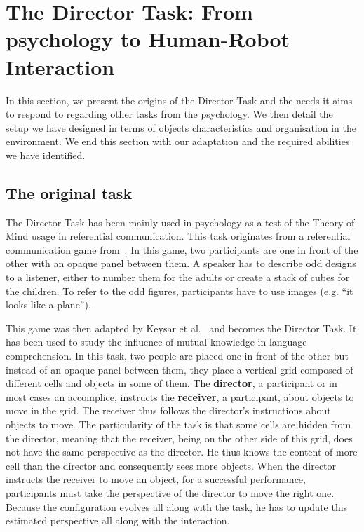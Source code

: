 \section[From psychology to Human-Robot Interaction]{The Director Task: From psychology to Human-Robot Interaction}

In this section, we present the origins of the Director Task and the needs it aims to respond to regarding other tasks from the psychology. We then detail the setup we have designed in terms of objects characteristics and organisation in the environment. We end this section with our adaptation and the required abilities we have identified.

\subsection{The original task}

The Director Task has been mainly used in psychology as a test of the Theory-of-Mind usage in referential communication. This task originates from a referential communication game from~\cite{krauss_1977_social}. In this game, two participants are one in front of the other with an opaque panel between them. A speaker has to describe odd designs to a listener, either to number them for the adults or create a stack of cubes for the children. To refer to the odd figures, participants have to use images (e.g. ``it looks like a plane'').

This game was then adapted by Keysar et al.~\cite{keysar_2000_taking} and becomes the Director Task. It has been used to study the influence of mutual knowledge in language comprehension. In this task, two people are placed one in front of the other but instead of an opaque panel between them, they place a vertical grid composed of different cells and objects in some of them. The \textbf{director}, a participant or in most cases an accomplice, instructs the \textbf{receiver}, a participant, about objects to move in the grid. The receiver thus follows the director's instructions about objects to move. The particularity of the task is that some cells are hidden from the director, meaning that the receiver, being on the other side of this grid, does not have the same perspective as the director. He thus knows the content of more cell than the director and consequently sees more objects. When the director instructs the receiver to move an object, for a successful performance, participants must take the perspective of the director to move the right one. Because the configuration evolves all along with the task, he has to update this estimated perspective all along with the interaction.

